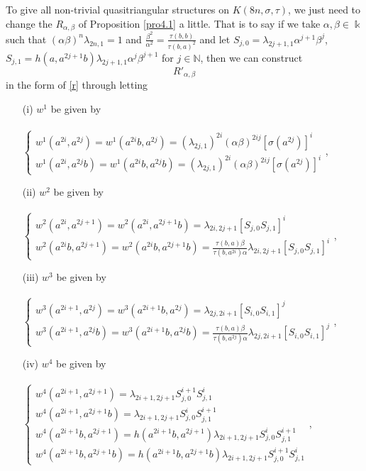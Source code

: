 \documentclass[a4paper,11pt]{amsart}
\numberwithin{equation}{section}
\begin{document}
To give all non-trivial quasitriangular structures on $K(8n,\sigma,\tau)$, we just need to change the $R_{\alpha,\beta}$ of Proposition \ref{pro4.1} a little. That is to say if we take $\alpha,\beta \in \Bbbk$ such that $(\alpha\beta)^n\lambda_{2n,1}=1$ and $\frac{\beta^2}{\alpha^2}=\frac{\tau(b,b)}{\tau(b,a)^2}$ and let $S_{j,0}=\lambda_{2j+1,1}\alpha^{j+1}\beta^j$, $S_{j,1}=h(a,a^{2j+1}b)\lambda_{2j+1,1}\alpha^j\beta^{j+1}$ for $j\in \mathbb{N}$, then we can construct    $$R'_{\alpha,\beta}$$
 in the form of \eqref{r} through letting
\begin{itemize}
\item[(i)] $w^1$ be given by \\\\
$ \left\{
\begin{array}{l}
w^1(a^{2i},a^{2j})=w^1(a^{2i}b,a^{2j})=(\lambda_{2j,1})^{2i}(\alpha\beta)^{2ij}[\sigma(a^{2j})]^i\\
w^1(a^{2i},a^{2j}b)=w^1(a^{2i}b,a^{2j}b)=(\lambda_{2j,1})^{2i}(\alpha\beta)^{2ij}[\sigma(a^{2j})]^i
\end{array} \right.$,\\

\item[(ii)] $w^2$ be given by  \\\\
$ \left\{
\begin{array}{l}
w^2(a^{2i},a^{2j+1})=w^2(a^{2i},a^{2j+1}b)=\lambda_{2i,2j+1}[S_{j,0}S_{j,1}]^{i}\\
w^2(a^{2i}b,a^{2j+1})=w^2(a^{2i}b,a^{2j+1}b)=\frac{\tau(b,a)\beta}{\tau(b,a^{2i})\alpha}
\lambda_{2i,2j+1}[S_{j,0}S_{j,1}]^{i}
\end{array} \right.$,\\

\item[(iii)] $w^3$ be given by \\\\
$ \left\{
\begin{array}{l}
w^3(a^{2i+1},a^{2j})=w^3(a^{2i+1}b,a^{2j})=\lambda_{2j,2i+1}[S_{i,0}S_{i,1}]^{j}\\
w^3(a^{2i+1},a^{2j}b)=w^3(a^{2i+1}b,a^{2j}b)=\frac{\tau(b,a)\beta}{\tau(b,a^{2j})\alpha}
\lambda_{2j,2i+1}[S_{i,0}S_{i,1}]^{j}
\end{array} \right.$,\\

\item[(iv)] $w^4$ be given by \\\\
$ \left\{
\begin{array}{l}
w^4(a^{2i+1},a^{2j+1})=\lambda_{2i+1,2j+1}S_{j,0}^{i+1}S_{j,1}^{i}\\
w^4(a^{2i+1},a^{2j+1}b)=\lambda_{2i+1,2j+1}S_{j,0}^{i}S_{j,1}^{i+1}\\
w^4(a^{2i+1}b,a^{2j+1})=h(a^{2i+1}b,a^{2j+1})\lambda_{2i+1,2j+1}S_{j,0}^{i}S_{j,1}^{i+1}\\
w^4(a^{2i+1}b,a^{2j+1}b)=h(a^{2i+1}b,a^{2j+1}b)\lambda_{2i+1,2j+1}S_{j,0}^{i+1}S_{j,1}^{i}
\end{array} \right.$,\\
 \end{itemize}
\end{document}
